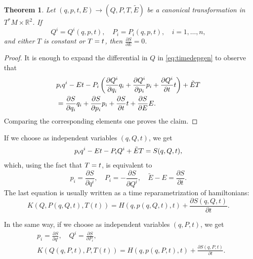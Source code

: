 \documentclass[english,fontsize=11pt,paper=a5,oneside]{scrbook}
\newcommand{\R}{\mathbb{R}}
\let\d\relax
\DeclareMathOperator{\d}{d}
\newtheorem{theorem}{Theorem}[chapter]
\theoremstyle{definition}
\begin{document}
\begin{theorem}\label{thm:Ham0}
    Let $(q,p,t,E) \to (Q,P,T,\tilde E)$ be a canonical transformation in $T^*M\times \R^2$. If
    \begin{equation}
        Q^i = Q^i(q,p,t), \quad P_i = P_i(q,p,t), \quad i=1,\ldots,n,
    \end{equation}
    and either $T$ is constant or $\d T = \d t$, then $\frac{\partial S}{\partial E} = 0$.
\end{theorem}
\begin{proof}
    It is enough to expand the differential in $Q$ in \eqref{eq:timedepgen} to observe that
    \begin{align}
        &p_i \d q^i -E \d t - P_i \left(
            \frac{\partial Q^i}{\partial q_i}\d q_i
            +\frac{\partial Q^i}{\partial p_i}\d p_i
            +\frac{\partial Q^i}{\partial t}\d t
            \right) + \tilde E \d T \\
        &= 
            \frac{\partial S}{\partial q_i}\d q_i
            +\frac{\partial S}{\partial p_i}\d p_i
            +\frac{\partial S}{\partial t}\d t
            +\frac{\partial S}{\partial E}\d E.
    \end{align}
    Comparing the corresponding elements one proves the claim.
\end{proof}

If we choose as independent variables $(q,Q,t)$, we get
\begin{equation}
    p_i \d q^i - E \d t -P_i \d Q^i + \tilde E\d T = \d S(q,Q,t),
\end{equation}
which, using the fact that $\d T = \d t$, is equivalent to
\begin{equation}\label{eq:motionpPEtE}
    p_i = \frac{\partial S}{\partial q^i}, \quad
    P_i = - \frac{\partial S}{\partial Q^i}, \quad
    \tilde E - E = \frac{\partial S}{\partial t}.
\end{equation}
The last equation is usually written as a time reparametrization of hamiltonians:
\begin{equation}\label{eq:time-reparamqQt}
    K(Q, P(q,Q,t), T(t)) = H(q,p(q,Q,t),t) + \frac{\partial S(q,Q,t)}{\partial t}.
\end{equation}

In the same way, if we choose as independent variables $(q,P,t)$, we get
\begin{align}
    &p_i = \frac{\partial S}{\partial q^i}, \quad Q^i = \frac{\partial S}{\partial P_i},\\
    &K(Q(q,P,t), P, T(t)) = H(q, p(q,P,t),t) + \frac{\partial S(q,P,t)}{\partial t}.\label{eq:time-reparamqPt}
\end{align}
\end{document}
